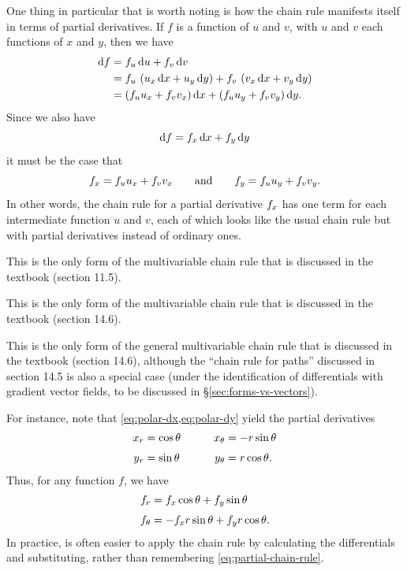One thing in particular that is worth noting is how the chain rule manifests itself in terms of partial derivatives.
If $f$ is a function of $u$ and $v$, with $u$ and $v$ each functions of $x$ and $y$, then we have
\begin{align*}
  {\ensuremath{\mathrm{d} f}} &= {f}_{u}\,{\mathrm{d} u} + {f}_{v}\,{\mathrm{d} v}\\
  &= {f}_{u}\,\left({u}_{x}\,{\mathrm{d} x} + {u}_{y}\,{\mathrm{d} y}\right) + {f}_{v}\,\left({v}_{x}\,{\mathrm{d} x} + {v}_{y}\,{\mathrm{d} y}\right)\\
  &= \left({f}_{u}{u}_{x}+ {f}_{v}{v}_{x}\right){\mathrm{d} x} + \left({f}_{u}{u}_{y}+ {f}_{v}{v}_{y}\right){\mathrm{d} y}.
\end{align*}
Since we also have
\[ {\mathrm{d} f} = {f}_{x}\,{\mathrm{d} x} + {f}_{y}\,{\mathrm{d} y} \]
it must be the case that
\begin{equation}\label{eq:partial-chain-rule}
  {f}_{x} = {f}_{u}{u}_{x}+ {f}_{v}{v}_{x}
  \qquad\text{and}\qquad
  {f}_{y} = {f}_{u}{u}_{y}+ {f}_{v}{v}_{y}.
\end{equation}
In other words, the chain rule for a partial derivative ${f}_{x}$ has one term for each intermediate function $u$ and $v$, each of which looks like the usual chain rule but with partial derivatives instead of ordinary ones.
\begin{stewart}This is the only form of the multivariable chain rule that is discussed in the textbook (section 11.5).\end{stewart}%
\begin{hugheshallett}This is the only form of the multivariable chain rule that is discussed in the textbook (section 14.6).\end{hugheshallett}%
\begin{rogawski}This is the only form of the general multivariable chain rule that is discussed in the textbook (section 14.6), although the ``chain rule for paths'' discussed in section 14.5 is also a special case (under the identification of differentials with gradient vector fields, to be discussed in \S\ref{sec:forms-vs-vectors}).\end{rogawski}%

For instance, note that \cref{eq:polar-dx,eq:polar-dy} yield the partial derivatives
\begin{alignat*}{2}
  {x}_{r} &= \cos\theta &\qquad
  {x}_{\theta} &= -r\sin\theta\\[3pt]
  {y}_{r} &= \sin\theta &\quad
  {y}_{\theta} &= r\cos\theta.
\end{alignat*}
Thus, for any function $f$, we have
\begin{align*}
  \pder{f}{r} %
  &= \pder{f}{x} \cos\theta + \pder{f}{y} \sin\theta\\[3pt]
  \pder{f}{\theta} %
  &= -\pder{f}{x} r\sin\theta + \pder{f}{y} r \cos \theta.
\end{align*}
In practice, is often easier to apply the chain rule by calculating the differentials and substituting, rather than remembering \cref{eq:partial-chain-rule}.



